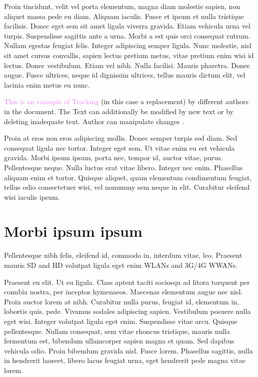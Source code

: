 Proin tincidunt, velit vel porta elementum, magna diam molestie sapien, non aliquet massa pede eu diam. Aliquam iaculis. Fusce et ipsum et nulla tristique facilisis. Donec eget sem sit amet ligula viverra gravida. Etiam vehicula urna vel turpis. Suspendisse sagittis ante a urna. Morbi a est quis orci consequat rutrum. Nullam egestas feugiat felis. Integer adipiscing semper ligula. Nunc molestie, nisl sit amet cursus convallis, sapien lectus pretium metus, vitae pretium enim wisi id lectus. Donec vestibulum. Etiam vel nibh. Nulla facilisi. Mauris pharetra. Donec augue. Fusce ultrices, neque id dignissim ultrices, tellus mauris dictum elit, vel lacinia enim metus eu nunc.

\textcolor{violet}{This is an example of Tracking}  (in this case a replacement) by different authors in the document. The Text can additionally be modified by  new text or by deleting  inadequate text. Author can manipulate changes .

Proin at eros non eros adipiscing mollis. Donec semper turpis sed diam. Sed consequat ligula nec tortor. Integer eget sem. Ut vitae enim eu est vehicula gravida. Morbi ipsum ipsum, porta nec, tempor id, auctor vitae, purus. Pellentesque neque. Nulla luctus erat vitae libero. Integer nec enim. Phasellus aliquam enim et tortor. Quisque aliquet, quam elementum condimentum feugiat, tellus odio consectetuer wisi, vel nonummy sem neque in elit. Curabitur eleifend wisi iaculis ipsum.
\section{Morbi ipsum ipsum}
Pellentesque nibh felis, eleifend id, commodo in, interdum vitae, leo.
 Praesent mauris \ac{SD} and \ac{HD} volutpat ligula eget enim \acp{WLAN} and 3G\slash 4G \acp{WWAN}.

Praesent eu elit. Ut eu ligula. Class aptent taciti sociosqu ad litora torquent per conubia nostra, per inceptos hymenaeos. Maecenas elementum augue nec nisl. Proin auctor lorem at nibh. Curabitur nulla purus, feugiat id, elementum in, lobortis quis, pede. Vivamus sodales adipiscing sapien. Vestibulum posuere nulla eget wisi. Integer volutpat ligula eget enim. Suspendisse vitae arcu. Quisque pellentesque. Nullam consequat, sem vitae rhoncus tristique, mauris nulla fermentum est, bibendum ullamcorper sapien magna et quam. Sed dapibus vehicula odio. Proin bibendum gravida nisl. Fusce lorem. Phasellus sagittis, nulla in hendrerit laoreet, libero lacus feugiat urna, eget hendrerit pede magna vitae lorem.

